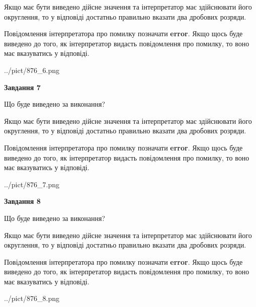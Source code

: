 \documentclass[12pt, ukrainian]{article}
\begin{document}
{\begin {Large}
Якщо має бути виведено дійсне значення та інтерпретатор має здійснювати його округлення, 
то у відповіді достатньо правильно вказати два дробових розряди.

Повідомлення інтерпретатора про помилку позначати \textbf{error}.
Якщо щось буде виведено до того, як інтерпретатор видасть повідомлення про помилку, 
то воно має вказуватись у відповіді. \par

\begin{center}
	{../pict/876_6.png}
\end{center}
\newpage

{\begin {center}\textbf{Завдання 7}\end {center}}\par
Що буде виведено за виконання? \par

Якщо має бути виведено дійсне значення та інтерпретатор має здійснювати його округлення, 
то у відповіді достатньо правильно вказати два дробових розряди.

Повідомлення інтерпретатора про помилку позначати \textbf{error}.
Якщо щось буде виведено до того, як інтерпретатор видасть повідомлення про помилку, 
то воно має вказуватись у відповіді. \par

\begin{center}
	{../pict/876_7.png}
\end{center}
\newpage

{\begin {center}\textbf{Завдання 8}\end {center}}\par
Що буде виведено за виконання? \par

Якщо має бути виведено дійсне значення та інтерпретатор має здійснювати його округлення, 
то у відповіді достатньо правильно вказати два дробових розряди.

Повідомлення інтерпретатора про помилку позначати \textbf{error}.
Якщо щось буде виведено до того, як інтерпретатор видасть повідомлення про помилку, 
то воно має вказуватись у відповіді. \par

\begin{center}
	{../pict/876_8.png}
\end{center}
\newpage


\end{Large}}
\end{document}
